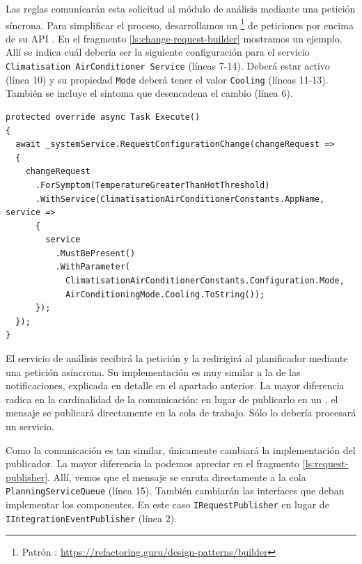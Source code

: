Las reglas comunicarán esta solicitud al módulo de análisis mediante una petición síncrona. Para simplificar el proceso, desarrollamos un \footnote{Patrón : \url{https://refactoring.guru/design-patterns/builder}} de peticiones por encima de su API . En el fragmento \ref{ls:change-request-builder} mostramos un ejemplo. Allí se indica cuál debería ser la siguiente configuración para el servicio \texttt{Climatisation AirConditioner Service} (líneas 7-14). Deberá estar activo (línea 10) y su propiedad \texttt{Mode} deberá tener el valor \texttt{Cooling} (líneas 11-13). También se incluye el síntoma que desencadena el cambio (línea 6).

\begin{lstlisting}[caption={Implementación de la misma petición siguiendo el patrón \emph{builder}.\protect\footnotemark},captionpos=b, label=ls:change-request-builder]
protected override async Task Execute()
{
  await _systemService.RequestConfigurationChange(changeRequest =>
  {
    changeRequest
      .ForSymptom(TemperatureGreaterThanHotThreshold)
      .WithService(ClimatisationAirConditionerConstants.AppName, service =>
      {
        service
          .MustBePresent()
          .WithParameter(
            ClimatisationAirConditionerConstants.Configuration.Mode,
            AirConditioningMode.Cooling.ToString());
      });
  });
}
\end{lstlisting}


El servicio de análisis recibirá la petición y la redirigirá al planificador mediante una petición asíncrona. Su implementación es muy similar a la de las notificaciones, explicada en detalle en el apartado anterior. La mayor diferencia radica en la cardinalidad de la comunicación: en lugar de publicarlo en un , el mensaje se publicará directamente en la cola de trabajo. Sólo lo debería procesará un servicio.

Como la comunicación es tan similar, únicamente cambiará la implementación del publicador. La mayor diferencia la podemos apreciar en el fragmento \ref{ls:request-publisher}. Allí, vemos que el mensaje se enruta directamente a la cola \texttt{PlanningServiceQueue} (línea 15). También cambiarán las interfaces que deban implementar los componentes. En este caso \texttt{IRequestPublisher} en lugar de \texttt{IIntegrationEventPublisher} (línea 2).

